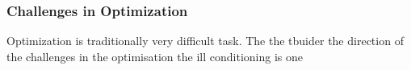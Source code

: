 \subsubsection{Challenges in Optimization}

Optimization is traditionally very difficult task. The the tbuider the direction of the challenges in the optimisation 
the ill conditioning is one 